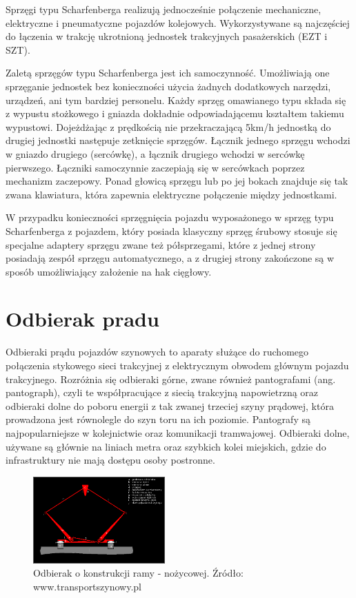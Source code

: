 Sprzęgi typu Scharfenberga realizują jednocześnie połączenie mechaniczne, elektryczne i pneumatyczne pojazdów kolejowych. Wykorzystywane są najczęściej do łączenia w trakcję ukrotnioną jednostek trakcyjnych pasażerskich (EZT i SZT).

Zaletą sprzęgów typu Scharfenberga jest ich samoczynność. Umożliwiają one sprzęganie jednostek bez konieczności użycia żadnych dodatkowych narzędzi, urządzeń, ani tym bardziej personelu. Każdy sprzęg omawianego typu składa się z wypustu stożkowego i gniazda dokładnie odpowiadającemu kształtem takiemu wypustowi.
Dojeżdżając z prędkością nie przekraczającą 5km/h jednostką do drugiej jednostki następuje zetknięcie sprzęgów. Łącznik jednego sprzęgu wchodzi w gniazdo drugiego (sercówkę), a łącznik drugiego wchodzi w sercówkę pierwszego. Łączniki samoczynnie zaczepiają się w sercówkach poprzez mechanizm zaczepowy. Ponad głowicą sprzęgu lub po jej bokach znajduje się tak zwana klawiatura, która zapewnia elektryczne połączenie między jednostkami.

W przypadku konieczności sprzęgnięcia pojazdu wyposażonego w sprzęg typu Scharfenberga z pojazdem, który posiada klasyczny sprzęg śrubowy stosuje się specjalne adaptery sprzęgu zwane też półsprzegami, które z jednej strony posiadają
zespół sprzęgu automatycznego, a z drugiej strony zakończone są w sposób umożliwiający założenie na hak cięgłowy.

\section{Odbierak pradu}
Odbieraki prądu pojazdów szynowych to aparaty służące do ruchomego połączenia stykowego sieci trakcyjnej z elektrycznym obwodem głównym pojazdu trakcyjnego. Rozróżnia się odbieraki górne, zwane również pantografami (ang. pantograph), czyli te współpracujące z siecią trakcyjną napowietrzną oraz odbieraki dolne do poboru energii z tak zwanej trzeciej szyny prądowej, która prowadzona jest równolegle do szyn toru na ich poziomie. 
Pantografy są najpopularniejsze w kolejnictwie oraz komunikacji tramwajowej. Odbieraki dolne, używane są głównie na liniach metra oraz szybkich kolei miejskich, gdzie do infrastruktury nie mają dostępu osoby postronne. 

\begin{figure}
	\includegraphics[width=0.45\textwidth]{skryptkierownik-img/kolodbierakschem1.png}
	\caption{Odbierak o konstrukcji ramy - nożycowej. Źródło: www.transportszynowy.pl}
	\label{fig:pantograf1}
\end{figure}

